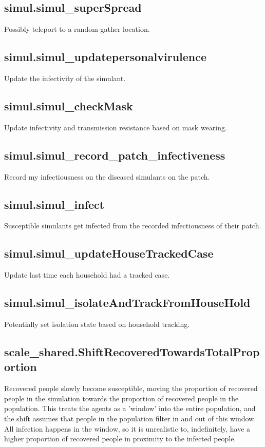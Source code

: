 \documentclass[]{article}
\begin{document}
\subsection{simul.simul\_superSpread}
Possibly teleport to a random gather location.

\subsection{simul.simul\_updatepersonalvirulence}
Update the infectivity of the simulant.

\subsection{simul.simul\_checkMask}
Update infectivity and transmission resistance based on mask wearing.

\subsection{simul.simul\_record\_patch\_infectiveness}
Record my infectiousness on the diseased simulants on the patch.

\subsection{simul.simul\_infect}
Susceptible simulants get infected from the recorded infectiousness of their patch.

\subsection{simul.simul\_updateHouseTrackedCase}
Update last time each household had a tracked case.

\subsection{simul.simul\_isolateAndTrackFromHouseHold}
Potentially set isolation state based on household tracking.

\subsection{scale\_shared.ShiftRecoveredTowardsTotalProportion}
Recovered people slowly become susceptible, moving the proportion of recovered people in the simulation towards the proportion of recovered people in the population. This treats the agents as a 'window' into the entire population, and the shift assumes that people in the population filter in and out of this window. All infection happens in the window, so it is unrealistic to, indefinitely, have a higher proportion of recovered people in proximity to the infected people.
\end{document}
